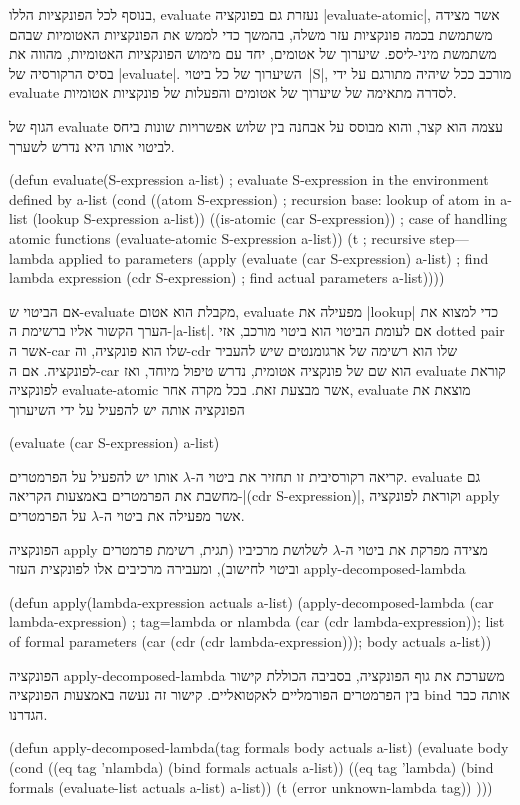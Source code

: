 בנוסף לכל הפונקציות הללו, evaluate נעזרת גם בפונקציה \E|evaluate-atomic|, אשר
מצידה משתמשת בכמה פונקציות עזר משלה, בהמשך כדי לממש את הפונקציות האטומיות שבהם
משתמשת מיני-ליספ. שיערוך של אטומים, יחד עם מימוש הפונקציות האטומיות, מהווה את
בסיס הרקורסיה של \E|evaluate|. השיערוך של כל ביטוי~\E|S|, מורכב ככל שיהיה
מתורגם על ידי evaluate לסדרה מתאימה של שיערוך של אטומים והפעלות של פונקציות
אטומיות.

הגוף של evaluate עצמה הוא קצר, והוא מבוסס על אבחנה בין שלוש אפשרויות שונות ביחס
לביטוי אותו היא נדרש לשערך.

\minipage\textwidth
\begin{KERNEL}
(defun evaluate(S-expression a-list) ; evaluate S-expression in the environment defined by a-list
  (cond ((atom S-expression) ; recursion base: lookup of atom in a-list
          (lookup S-expression a-list))
        ((is-atomic (car S-expression)) ; case of handling atomic functions
          (evaluate-atomic S-expression a-list))
        (t ; recursive step---lambda applied to parameters
          (apply (evaluate (car S-expression) a-list) ; find lambda expression
                  (cdr S-expression) ; find actual parameters
                  a-list))))
\end{KERNEL}
\endminipage

אם הביטוי ש-evaluate מקבלת הוא אטום, evaluate מפעילה את \E|lookup| כדי למצוא את
הערך הקשור אליו ברשימת ה-\E|a-list|. אם לעומת הביטוי הוא ביטוי מורכב, אזי
dotted pair אשר ה-car שלו הוא פונקציה, וה-cdr שלו הוא רשימה של
ארגומנטים שיש להעביר לפונקציה. אם ה-car הוא שם של פונקציה אטומית, נדרש טיפול
מיוחד, ואז evaluate קוראת לפונקציה evaluate-atomic אשר מבצעת זאת.
בכל מקרה אחר, evaluate מוצאת את הפונקציה אותה יש להפעיל על ידי השיערוך
\begin{LISP}
(evaluate (car S-expression) a-list)
\end{LISP}
קריאה רקורסיבית זו תחזיר את ביטוי ה-$λ$ אותו יש להפעיל על הפרמטרים. evaluate
גם מחשבת את הפרמטרים באמצעות הקריאה-\T|(cdr S-expression)|, וקוראת לפונקציה
apply אשר מפעילה את ביטוי ה-$λ$ על הפרמטרים.

הפונקציה apply מצידה מפרקת את ביטוי ה-$λ$ לשלושת מרכיביו (תגית, רשימת פרמטרים
וביטוי לחישוב), ומעבירה מרכיבים אלו לפונקצית העזר apply-decomposed-lambda
\begin{KERNEL}
(defun apply(lambda-expression actuals a-list)
  (apply-decomposed-lambda
    (car lambda-expression) ; tag=lambda or nlambda
    (car (cdr lambda-expression)); list of formal parameters
    (car (cdr (cdr lambda-expression))); body
    actuals
    a-list))
\end{KERNEL}
הפונקציה apply-decomposed-lambda משערכת את גוף הפונקציה, בסביבה הכוללת קישור בין
הפרמטרים הפורמליים לאקטואליים. קישור זה נעשה באמצעות הפונקציה bind אותה כבר
הגדרנו.
\begin{KERNEL}
(defun apply-decomposed-lambda(tag formals body actuals a-list)
  (evaluate body
    (cond ((eq tag 'nlambda) (bind formals actuals a-list))
          ((eq tag 'lambda) (bind formals (evaluate-list actuals a-list) a-list))
          (t (error unknown-lambda tag))
)))
\end{KERNEL}


